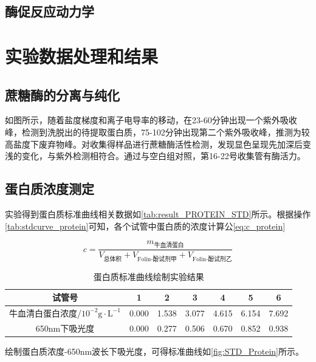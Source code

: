 \subsection{酶促反应动力学}



\section{实验数据处理和结果}

\subsection{蔗糖酶的分离与纯化}
 \par 如图所示，随着盐度梯度和离子电导率的移动，在23-60分钟出现一个紫外吸收峰，检测到洗脱出的待提取蛋白质，75-102分钟出现第二个紫外吸收峰，推测为较高盐度下废弃物峰。对收集得样品进行蔗糖酶活性检测，发现显色呈现先加深后变浅的变化，与紫外检测相符合。通过与空白组对照，第16-22号收集管有酶活力。
 
\subsection{蛋白质浓度测定}
实验得到蛋白质标准曲线相关数据如\autoref{tab:result_PROTEIN_STD}所示。根据操作\autoref{tab:stdcurve_protein}可知，各个试管中蛋白质的浓度计算公\autoref{eq:c_protein}

\begin{equation}
    c = \frac{m_\text{牛血清蛋白}}{V_\text{总体积}+V_\text{Folin-酚试剂甲}+V_\text{Folin-酚试剂乙}}
    \label{eq:c_protein}
\end{equation}

\begin{table}[H]
\centering
\caption{蛋白质标准曲线绘制实验结果}
\label{tab:result_PROTEIN_STD}
\begin{tabular}{@{}ccccccc@{}}
\toprule
试管号       & 1     & 2     & 3     & 4     & 5     & 6     \\ \midrule
牛血清白蛋白浓度/$10^{-2}\mathrm{g \cdot L^{-1}}$ & 0.000 & 1.538 & 3.077 & 4.615 & 6.154 & 7.692 \\
650nm下吸光度 & 0.000 & 0.277 & 0.506 & 0.670 & 0.852 & 0.938 \\ \bottomrule
\end{tabular}
\end{table}

绘制蛋白质浓度-650nm波长下吸光度，可得标准曲线如\autoref{fig:STD_Protein}所示。

